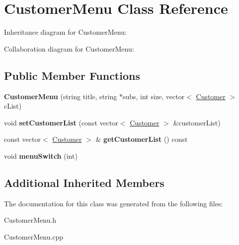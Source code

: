 \hypertarget{classCustomerMenu}{}\section{Customer\+Menu Class Reference}
\label{classCustomerMenu}


Inheritance diagram for Customer\+Menu\+:


Collaboration diagram for Customer\+Menu\+:
\subsection*{Public Member Functions}
\begin{DoxyCompactItemize}
\item 
{\bfseries Customer\+Menu} (string title, string $\ast$subs, int size, vector$<$ \hyperlink{classCustomer}{Customer} $>$ c\+List)\hypertarget{classCustomerMenu_a05bf66ccf5ce81d26cc4e39fbc2dbb64}{}\label{classCustomerMenu_a05bf66ccf5ce81d26cc4e39fbc2dbb64}

\item 
void {\bfseries set\+Customer\+List} (const vector$<$ \hyperlink{classCustomer}{Customer} $>$ \&customer\+List)\hypertarget{classCustomerMenu_abd785329cc569b15848388dd9e193613}{}\label{classCustomerMenu_abd785329cc569b15848388dd9e193613}

\item 
const vector$<$ \hyperlink{classCustomer}{Customer} $>$ \& {\bfseries get\+Customer\+List} () const \hypertarget{classCustomerMenu_a76d1f3b2b06c19ed15505c57c58564b4}{}\label{classCustomerMenu_a76d1f3b2b06c19ed15505c57c58564b4}

\item 
void {\bfseries menu\+Switch} (int)\hypertarget{classCustomerMenu_a9c43057a2fdd5fa1323e4cc1ec54f4be}{}\label{classCustomerMenu_a9c43057a2fdd5fa1323e4cc1ec54f4be}

\end{DoxyCompactItemize}
\subsection*{Additional Inherited Members}


The documentation for this class was generated from the following files\+:\begin{DoxyCompactItemize}
\item 
Customer\+Menu.\+h\item 
Customer\+Menu.\+cpp\end{DoxyCompactItemize}
